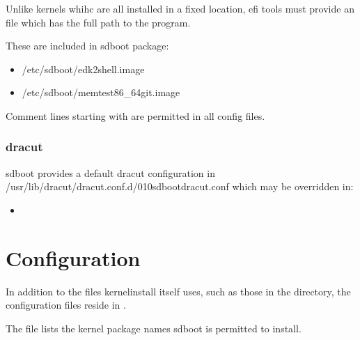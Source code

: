 \documentclass[letterpaper,11pt,english]{sphinxmanual}
\begin{document}
\sphinxAtStartPar
Unlike kernels whihc are all installed in a fixed location,
efi tools must provide an  file which has the
full path to the  program.

\sphinxAtStartPar
These are included in sd\sphinxhyphen{}boot package:
\begin{itemize}
\item {} 
\sphinxAtStartPar
/etc/sd\sphinxhyphen{}boot/edk2\sphinxhyphen{}shell.image

\item {} 
\sphinxAtStartPar
/etc/sd\sphinxhyphen{}boot/memtest86\_64\sphinxhyphen{}git.image

\end{itemize}

\sphinxAtStartPar
Comment lines starting with \sphinxstylestrong{\#} are permitted in all config files.


\subsection{dracut}
\label{\detokenize{Readme:dracut}}
\sphinxAtStartPar
sd\sphinxhyphen{}boot provides a default dracut configuration in /usr/lib/dracut/dracut.conf.d/010\sphinxhyphen{}sd\sphinxhyphen{}boot\sphinxhyphen{}dracut.conf
which may be overridden in:
\begin{itemize}
\item {} 
\sphinxAtStartPar
{}

\end{itemize}

\sphinxstepscope


\chapter{Configuration}
\label{\detokenize{Configuration:configuration}}\label{\detokenize{Configuration::doc}}
\sphinxAtStartPar
In addition to the files kernel\sphinxhyphen{}install itself uses, such as
those in the  directory, the  configuration files
reside in .

\sphinxAtStartPar
The file  lists the kernel package names
sd\sphinxhyphen{}boot is permitted to install.
\end{document}
